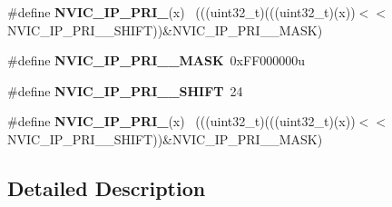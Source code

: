 \begin{DoxyCompactItemize}
\item 
\hypertarget{group___n_v_i_c___register___masks_ga6b64b6867cf2c44230d22848c38f941d}{}\#define {\bfseries N\+V\+I\+C\+\_\+\+I\+P\+\_\+\+P\+R\+I\+\_}(x)                                            ~(((uint32\+\_\+t)(((uint32\+\_\+t)(x))$<$$<$N\+V\+I\+C\+\_\+\+I\+P\+\_\+\+P\+R\+I\+\_\+\_\+\+S\+H\+I\+F\+T))\&N\+V\+I\+C\+\_\+\+I\+P\+\_\+\+P\+R\+I\+\_\+\_\+\+M\+A\+S\+K)\label{group___n_v_i_c___register___masks_ga6b64b6867cf2c44230d22848c38f941d}

\item 
\hypertarget{group___n_v_i_c___register___masks_ga1d7995d831b131dbed99ada825f4bf1f}{}\#define {\bfseries N\+V\+I\+C\+\_\+\+I\+P\+\_\+\+P\+R\+I\+\_\+\_\+\+M\+A\+S\+K}~0x\+F\+F000000u\label{group___n_v_i_c___register___masks_ga1d7995d831b131dbed99ada825f4bf1f}

\item 
\hypertarget{group___n_v_i_c___register___masks_gafa47835b72c6f2edc9c836e65d784669}{}\#define {\bfseries N\+V\+I\+C\+\_\+\+I\+P\+\_\+\+P\+R\+I\+\_\+\_\+\+S\+H\+I\+F\+T}~24\label{group___n_v_i_c___register___masks_gafa47835b72c6f2edc9c836e65d784669}

\item 
\hypertarget{group___n_v_i_c___register___masks_ga2732712760be5c9a20f1d90167678cec}{}\#define {\bfseries N\+V\+I\+C\+\_\+\+I\+P\+\_\+\+P\+R\+I\+\_}(x)                                              ~(((uint32\+\_\+t)(((uint32\+\_\+t)(x))$<$$<$N\+V\+I\+C\+\_\+\+I\+P\+\_\+\+P\+R\+I\+\_\+\_\+\+S\+H\+I\+F\+T))\&N\+V\+I\+C\+\_\+\+I\+P\+\_\+\+P\+R\+I\+\_\+\_\+\+M\+A\+S\+K)\label{group___n_v_i_c___register___masks_ga2732712760be5c9a20f1d90167678cec}

\end{DoxyCompactItemize}


\subsection{Detailed Description}
